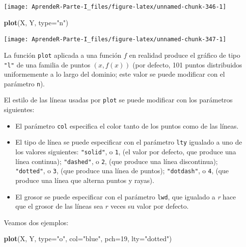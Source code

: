 \documentclass[]{book}
\newenvironment{Shaded}{\begin{snugshade}}{\end{snugshade}}
\newcommand{\DataTypeTok}[1]{\textcolor[rgb]{0.13,0.29,0.53}{#1}}
\newcommand{\DecValTok}[1]{\textcolor[rgb]{0.00,0.00,0.81}{#1}}
\newcommand{\KeywordTok}[1]{\textcolor[rgb]{0.13,0.29,0.53}{\textbf{#1}}}
\newcommand{\NormalTok}[1]{#1}
\newcommand{\StringTok}[1]{\textcolor[rgb]{0.31,0.60,0.02}{#1}}
\theoremstyle{definition}
\theoremstyle{definition}
\theoremstyle{definition}
\theoremstyle{remark}
\begin{document}
\begin{center}\texttt{[image: AprendeR-Parte-I\_files/figure-latex/unnamed-chunk-346-1]} \end{center}

\begin{Shaded}
\begin{Highlighting}[]
\KeywordTok{plot}\NormalTok{(X, Y, }\DataTypeTok{type=}\StringTok{"n"}\NormalTok{)}
\end{Highlighting}
\end{Shaded}

\begin{center}\texttt{[image: AprendeR-Parte-I\_files/figure-latex/unnamed-chunk-347-1]} \end{center}

La función \texttt{plot} aplicada a una función \(f\) en realidad produce el gráfico de tipo \texttt{"l"} de una familia de puntos \((x, f(x))\) (por defecto, 101 puntos distribuidos uniformemente a lo largo del dominio; este valor se puede modificar con el parámetro \texttt{n}).

El estilo de las líneas usadas por \texttt{plot} se puede modificar con los parámetros siguientes:

\begin{itemize}
\item
  El parámetro \texttt{col} especifica el color tanto de los puntos como de las líneas.
\item
  El tipo de línea se puede especificar con el parámetro \texttt{lty} igualado a uno de los valores siguientes: \texttt{"solid"}, o \texttt{1}, (el valor por defecto, que produce una línea continua); \texttt{"dashed"}, o \texttt{2}, (que produce una línea discontinua); \texttt{"dotted"}, o \texttt{3}, (que produce una línea de puntos); \texttt{"dotdash"}, o \texttt{4}, (que produce una línea que alterna puntos y rayas).
\item
  El grosor se puede especificar con el parámetro \texttt{lwd}, que igualado a \emph{r} hace que el grosor de las líneas sea \(r\) veces su valor por defecto.
\end{itemize}

Veamos dos ejemplos:

\begin{Shaded}
\begin{Highlighting}[]
\KeywordTok{plot}\NormalTok{(X, Y, }\DataTypeTok{type=}\StringTok{"o"}\NormalTok{, }\DataTypeTok{col=}\StringTok{"blue"}\NormalTok{, }\DataTypeTok{pch=}\DecValTok{19}\NormalTok{, }\DataTypeTok{lty=}\StringTok{"dotted"}\NormalTok{)}
\end{Highlighting}
\end{Shaded}
\end{document}

